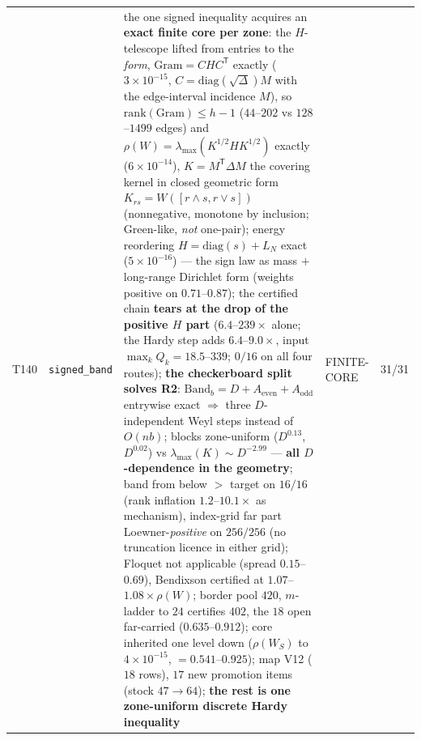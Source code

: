 \documentclass[11pt,a4paper]{article}
\begin{document}
{\begin{xltabular}{\linewidth}{@{}p{0.95cm} >{\raggedright\arraybackslash}p{3.1cm} Y >{\raggedright\scriptsize\arraybackslash}p{3.35cm} p{1.15cm}@{}}
T140 & \texttt{\scriptsize signed\_\allowbreak band} & the one signed inequality acquires an \textbf{exact finite core per zone}: the $H$-telescope lifted from entries to the \emph{form}, $\mathrm{Gram}=CHC^{\mathsf T}$ exactly ($3\times10^{-15}$, $C=\mathrm{diag}(\sqrt\Delta)M$ with the edge-interval incidence $M$), so $\mathrm{rank}(\mathrm{Gram})\le h-1$ ($44$--$202$ vs $128$--$1499$ edges) and $\rho(W)=\lambda_{\max}(K^{1/2}HK^{1/2})$ exactly ($6\times10^{-14}$), $K=M^{\mathsf T}\Delta M$ the covering kernel in closed geometric form $K_{rs}=W([r\wedge s,r\vee s])$ (nonnegative, monotone by inclusion; Green-like, \emph{not} one-pair); energy reordering $H=\mathrm{diag}(s)+L_N$ exact ($5\times10^{-16}$) --- the sign law as mass $+$ long-range Dirichlet form (weights positive on $0.71$--$0.87$); the certified chain \textbf{tears at the drop of the positive $H$ part} ($6.4$--$239\times$ alone; the Hardy step adds $6.4$--$9.0\times$, input $\max_kQ_k=18.5$--$339$; $0/16$ on all four routes); \textbf{the checkerboard split solves R2}: $\mathrm{Band}_b=D+A_{\mathrm{even}}+A_{\mathrm{odd}}$ entrywise exact $\Rightarrow$ three $D$-independent Weyl steps instead of $O(nb)$; blocks zone-uniform ($D^{0.13}$, $D^{0.02}$) vs $\lambda_{\max}(K)\sim D^{-2.99}$ --- \textbf{all $D$-dependence in the geometry}; band from below $>$ target on $16/16$ (rank inflation $1.2$--$10.1\times$ as mechanism), index-grid far part Loewner-\emph{positive} on $256/256$ (no truncation licence in either grid); Floquet not applicable (spread $0.15$--$0.69$), Bendixson certified at $1.07$--$1.08\times\rho(W)$; border pool $420$, $m$-ladder to $24$ certifies $402$, the $18$ open far-carried ($0.635$--$0.912$); core inherited one level down ($\rho(W_S)$ to $4\times10^{-15}$, $=0.541$--$0.925$); map V12 ($18$ rows), $17$ new promotion items (stock $47\to64$); \textbf{the rest is one zone-uniform discrete Hardy inequality} & FINITE-CORE & 31/31\\

\end{xltabular}}
\end{document}
